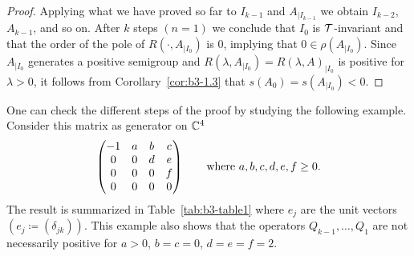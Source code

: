 \begin{proof}
	Applying what we have proved so far to $I_{k-1}$ and $A_{|I_{k-1}}$ we obtain $I_{k-2}$, $A_{k-1}$, and so on.
	After $k$ steps $(n=1)$ we conclude that $I_{0}$ is $\mathcal{T}$-invariant and that the order of the pole of\/ $R(\cdot,A_{|I_{0}})$ is $0$, 
	implying that $0 \in \rho(A_{|I_{0}})$.
	Since $A_{|I_{0}}$ generates a positive semigroup and $R(\lambda,A_{|I_{0}}) = R(\lambda,A)_{|I_{0}}$ is positive for $\lambda > 0$, it follows from Corollary~\ref{cor:b3-1.3} that $s(A_{0}) = s(A_{|I_{0}}) < 0$.
\end{proof}
One can check the different steps of the proof by studying the following example.
Consider this matrix as generator on $\mathbb{C}^{4}$
\[
\begin{pmatrix}
	-1 & a & b & c \\
	0 & 0 & d & e \\
	0 & 0 & 0 & f \\
	0 & 0 & 0 & 0
\end{pmatrix}
\quad \quad \text{where $ a,b,c,d,e,f \geq 0 $.} 
\]
The result is summarized in Table~\vref{tab:b3-table1} where $e_{j}$ are the unit vectors $(e_{j} \coloneq (\delta_{jk}))$.
This example also shows that the operators $Q_{k-1}, \ldots, Q_{1}$ are not necessarily positive \eg for $a>0$, $b=c=0$, $d=e=f=2$.

